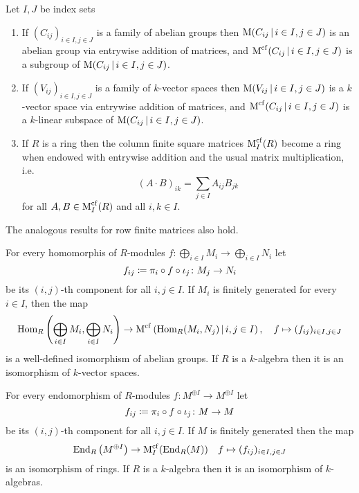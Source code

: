 \begin{lemma}
  \label{lemma: structure on infinite matrices}
  Let $I, J$ be index sets
  \begin{enumerate}
    \item
      If $(C_{ij})_{i \in I, j \in J}$ is a family of abelian groups then $\Mat(C_{ij} \suchthat i \in I, j \in J)$ is an abelian group via entrywise addition of matrices, and $\Mat^{\cf}(C_{ij} \suchthat i \in I, j \in J)$ is a subgroup of $\Mat(C_{ij} \suchthat i \in I, j \in J)$.
    \item
      If $(V_{ij})_{i \in I, j \in J}$ is a family of $k$-vector spaces then $\Mat(V_{ij} \suchthat i \in I, j \in J)$ is a $k$-vector space via entrywise addition of matrices, and $\Mat^{\cf}(C_{ij} \suchthat i \in I, j \in J)$ is a $k$-linear subspace of $\Mat(C_{ij} \suchthat i \in I, j \in J)$.
    \item
      If $R$ is a ring then the column finite square matrices $\operatorname{M}^{{\operatorname{cf}}}_I(R)$ become a ring when endowed with entrywise addition and the usual matrix multiplication, i.e.\
      \[
          (A \cdot B)_{ik}
        = \sum_{j \in I} A_{ij} B_{jk}
      \]
      for all $A, B \in \operatorname{M}^{{\operatorname{cf}}}_I(R)$ and all $i, k \in I$.
  \end{enumerate}
  The analogous results for row finite matrices also hold.
\end{lemma}


\begin{corollary}
  For every homomorphis of $R$-modules $f \colon \bigoplus_{i \in I} M_i \to \bigoplus_{i \in I} N_i$ let
  \[
              f_{ij}
    \coloneqq  \pi_i \circ f \circ \iota_j
    \colon    M_j
    \to       N_i
  \]
  be its $(i,j)$-th component for all $i, j \in I$.
  If $M_i$ is finitely generated for every $i \in I$, then the map
  \[
            \Hom_R\left( \bigoplus_{i \in I} M_i, \bigoplus_{i \in I} N_i \right)
    \to     \Mat^{\cf}\left( \Hom_R(M_i, N_j) \suchthat i,j \in I \right),
    \quad   f
    \mapsto (f_{ij})_{i \in I, j \in J}
  \]
  is a well-defined isomorphism of abelian groups.
  If $R$ is a $k$-algebra then it is an isomorphism of $k$-vector spaces.
\end{corollary}


\begin{corollary}
  \label{corollary: endomorphism ring of sum power of fg module}
  For every endomorphism of $R$-modules $f \colon M^{\oplus I} \to M^{\oplus I}$ let
  \[
              f_{ij}
    \coloneqq  \pi_i \circ f \circ \iota_j
    \colon    M
    \to       M
  \]
  be its $(i,j)$-th component for all $i, j \in I$.
  If $M$ is finitely generated then the map
    \[
            \operatorname{End}_R\left( M^{\oplus I} \right)
    \to     \operatorname{M}^{{\operatorname{cf}}}_I( \operatorname{End}_R(M) )
    \quad   f
    \mapsto (f_{ij})_{i \in I, j \in J}
  \]
  is an isomorphism of rings.
  If $R$ is a $k$-algebra then it is an isomorphism of $k$-algebras.
\end{corollary}





